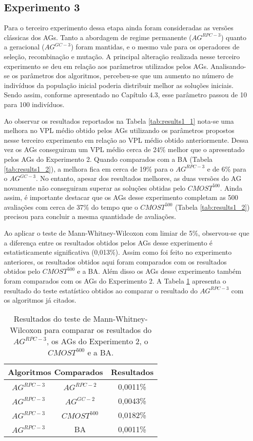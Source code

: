 \subsection{Experimento 3}

Para o terceiro experimento dessa etapa ainda foram consideradas as versões clássicas dos AGs. Tanto a abordagem de regime permanente ($AG^{RPC-3}$) quanto a geracional ($AG^{GC-3}$) foram mantidas, e o mesmo vale para os operadores de seleção, recombinação e mutação. A principal alteração realizada nesse terceiro experimento se deu em relação aos parâmetros utilizados pelos AGs. Analisando-se os parâmetros dos algoritmos, percebeu-se que um aumento no número de indivíduos da população inicial poderia distribuir melhor as soluções iniciais. Sendo assim, conforme apresentado no Capítulo 4.3, esse parâmetro passou de 10 para 100 indivíduos.

Ao observar os resultados reportados na Tabela \ref{tab:results1_1} nota-se uma melhora no VPL médio obtido pelos AGs utilizando os parâmetros propostos nesse terceiro experimento em relação ao VPL médio obtido anteriormente. Dessa vez os AGs conseguiram um VPL médio cerca de 24\% melhor que o apresentado pelos AGs do Experimento 2. Quando comparados com a BA (Tabela \ref{tab:results1_2}), a melhora fica em cerca de 19\% para o $AG^{RPC-3}$ e de 6\% para o $AG^{GC-3}$. No entanto, apesar dos resultados melhores, as duas versões do AG novamente não conseguiram superar as soluções obtidas pelo $CMOST^{500}$. Ainda assim, é importante destacar que os AGs desse experimento completam as 500 avaliações com cerca de 37\% do tempo que o $CMOST^{500}$ (Tabela \ref{tab:results1_2}) precisou para concluir a mesma quantidade de avaliações.

Ao aplicar o teste de Mann-Whitney-Wilcoxon com limiar de 5\%, observou-se que a diferença entre os resultados obtidos pelos AGs desse experimento é estatisticamente significativa (0,013\%). Assim como foi feito no experimento anteriores, os resultados obtidos aqui foram comparados com os resultados obtidos pelo $CMOST^{500}$ e a BA. Além disso os AGs desse experimento também foram comparados com os AGs do Experimento 2. A Tabela \ref{tab:mw3_1} apresenta o resultado do teste estatístico obtidos ao comparar o resultado do $AG^{RPC-3}$ com os algoritmos já citados.

\begin{table}[H]
\centering
\caption{Resultados do teste de Mann-Whitney-Wilcoxon para comparar os resultados do $AG^{RPC-3}$, os AGs do Experimento 2, o $CMOST^{500}$ e a BA.}
\label{tab:mw3_1}
\begin{tabular}{|c|c|c|}
\hline
\multicolumn{2}{|c|}{Algoritmos Comparados} & Resultados \\ \hline
$AG^{RPC-3}$ & $AG^{RPC-2}$ & 0,0011\% \\ \hline
$AG^{RPC-3}$ & $AG^{GC-2}$ & 0,0043\% \\ \hline
$AG^{RPC-3}$ & $CMOST^{500}$ & 0,0182\% \\ \hline
$AG^{RPC-3}$ & BA & 0,0011\% \\ \hline

\end{tabular}
\end{table}

